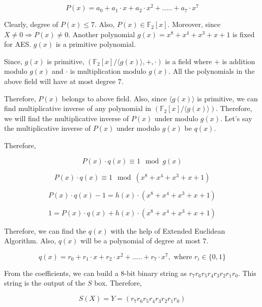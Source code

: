 \documentclass[11pt]{article}
\begin{document}
\[ P(x) = a_0 + a_1 \cdot x + a_2 \cdot x^2 + ..... + a_7 \cdot x^7 \]

Clearly, degree of $P(x) \leq 7$. Also, $P(x) \in \mathbb{F}_2[x]$. Moreover, since $X \neq 0 \Rightarrow P(x) \neq 0$. Another polynomial $g(x) = x^8 + x^4 + x^3 + x + 1$ is fixed for AES. $g(x)$ is a primitive polynomial.

Since, $g(x)$ is primitive, $(\mathbb{F}_2[x]/\langle g(x) \rangle, +, \cdot)$ is a field where $+$ is addition modulo $g(x)$ and $\cdot$ is multiplication modulo $g(x)$. All the polynomials in the above field will have at most degree $7$.

Therefore, $P(x)$ belongs to above field. Also, since $\langle g(x) \rangle$ is primitive, we can find multiplicative inverse of any polynomial in $(\mathbb{F}_2[x]/\langle g(x) \rangle)$. Therefore, we will find the multiplicative inverse of $P(x)$ under modulo $g(x)$. Let’s say the multiplicative inverse of $P(x)$ under modulo $g(x)$ be $q(x)$.

Therefore,

\[ P(x) \cdot q(x) \equiv 1 \mod g(x) \]

\[ P(x) \cdot q(x) \equiv 1 \mod(x^8 + x^4 + x^3 + x + 1) \]

\[ P(x) \cdot q(x) - 1 = h(x) \cdot (x^8 + x^4 + x^3 + x + 1) \]

\[ 1 = P(x) \cdot q(x) + h(x) \cdot (x^8 + x^4 + x^3 + x + 1) \]

Therefore, we can find the $q(x)$ with the help of Extended Euclidean Algorithm. Also, $q(x)$ will be a polynomial of degree at most $7$.

\[ q(x) = r_0 + r_1 \cdot x + r_2 \cdot x^2 + ..... + r_7 \cdot x^7, \text{ where } r_i \in \{0, 1\} \]

From the coefficients, we can build a $8$-bit binary string as $r_7r_6r_5r_4r_3r_2r_1r_0$. This string is the output of the $S$ box. Therefore,

\[ S(X) = Y = (r_7r_6r_5r_4r_3r_2r_1r_0) \]
\end{document}

